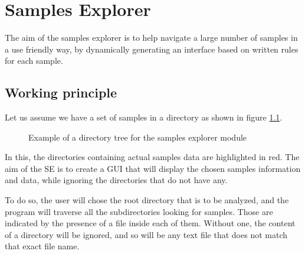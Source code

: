 \chapter{Samples Explorer}

The aim of the samples explorer is to help navigate a large number of samples in a use friendly way, by dynamically generating an interface based on written rules for each sample.

\section{Working principle}

Let us assume we have a set of samples in a directory as shown in figure \ref{samples_explorer_directories}.

\def\step{0.5}
\newcommand{\dpoint}[2]{(#1*\step,-#2*\step)}
\newcommand{\dcorner}[4]{\draw [thick] \dpoint{#1}{#2} -- \dpoint{#1}{#4}; \draw [thick] \dpoint{#1}{#4} -- \dpoint{#3}{#4};}
\begin{figure}[!ht]
\caption{Example of a directory tree for the samples explorer module}
\label{samples_explorer_directories}
\end{figure}
In this, the directories containing actual samples data are highlighted in red. The aim of the SE is to create a GUI that will display the chosen samples information and data, while ignoring the directories that do not have any.

To do so, the user will chose the root directory that is to be analyzed, and the program will traverse all the subdirectories looking for samples. Those are indicated by the presence of a  file inside each of them. Without one, the content of a directory will be ignored, and so will be any text file that does not match that exact file name.



